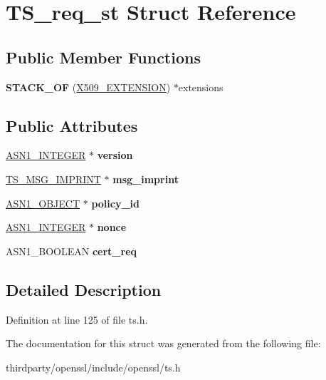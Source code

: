 \hypertarget{struct_t_s__req__st}{}\section{T\+S\+\_\+req\+\_\+st Struct Reference}
\label{struct_t_s__req__st}
\subsection*{Public Member Functions}
\begin{DoxyCompactItemize}
\item 
\mbox{\label{struct_t_s__req__st_a3ac81ef0b6e4741d98a3ab19b46bb51b}} 
{\bfseries S\+T\+A\+C\+K\+\_\+\+OF} (\hyperlink{struct_x509__extension__st}{X509\+\_\+\+E\+X\+T\+E\+N\+S\+I\+ON}) $\ast$extensions
\end{DoxyCompactItemize}
\subsection*{Public Attributes}
\begin{DoxyCompactItemize}
\item 
\mbox{\label{struct_t_s__req__st_aa404dd344baaf8d45b951fb6818e0ea6}} 
\hyperlink{structasn1__string__st}{A\+S\+N1\+\_\+\+I\+N\+T\+E\+G\+ER} $\ast$ {\bfseries version}
\item 
\mbox{\label{struct_t_s__req__st_a67ac68f0ed40b4230451fecd2e792697}} 
\hyperlink{struct_t_s__msg__imprint__st}{T\+S\+\_\+\+M\+S\+G\+\_\+\+I\+M\+P\+R\+I\+NT} $\ast$ {\bfseries msg\+\_\+imprint}
\item 
\mbox{\label{struct_t_s__req__st_a11bdc5b6a551d6e36046fbac834ffc83}} 
\hyperlink{structasn1__object__st}{A\+S\+N1\+\_\+\+O\+B\+J\+E\+CT} $\ast$ {\bfseries policy\+\_\+id}
\item 
\mbox{\label{struct_t_s__req__st_ad18dbde081c6d4caf09b5a6bce093221}} 
\hyperlink{structasn1__string__st}{A\+S\+N1\+\_\+\+I\+N\+T\+E\+G\+ER} $\ast$ {\bfseries nonce}
\item 
\mbox{\label{struct_t_s__req__st_a9be51acb28db78bc8584e5a51e03be59}} 
A\+S\+N1\+\_\+\+B\+O\+O\+L\+E\+AN {\bfseries cert\+\_\+req}
\end{DoxyCompactItemize}


\subsection{Detailed Description}


Definition at line 125 of file ts.\+h.



The documentation for this struct was generated from the following file\+:\begin{DoxyCompactItemize}
\item 
thirdparty/openssl/include/openssl/ts.\+h\end{DoxyCompactItemize}
